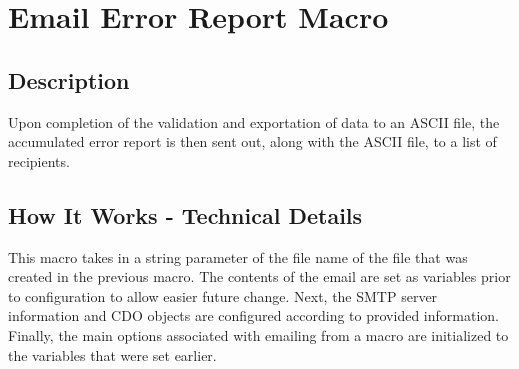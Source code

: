 \documentclass[12pt,a4paper]{report}
\begin{document}
    \section{Email Error Report Macro}
    \subsection{Description}
    
    Upon completion of the validation and exportation of data to an ASCII file, the accumulated error report is then sent out, along with the ASCII file, to a list of recipients.
    
    \subsection{How It Works - Technical Details}

    This macro takes in a string parameter of the file name of the file that was created in the previous macro. The contents of the email are set as variables prior to configuration to allow easier future change.
    \newline
    \newline
    Next, the SMTP server information and CDO objects are configured according to provided information. Finally, the main options associated with emailing from a macro are initialized to the variables that were set earlier. 
\end{document}

